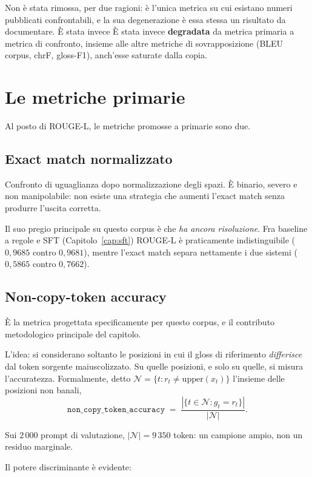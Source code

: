 Non è stata rimossa, per due ragioni: è l'unica metrica su cui esistano numeri
pubblicati confrontabili, e la sua degenerazione è essa stessa un risultato da
documentare. È stata invece  È stata invece \textbf{degradata} da metrica primaria a metrica di
confronto, insieme alle altre metriche di sovrapposizione (BLEU corpus, chrF,
gloss-F1), anch'esse saturate dalla copia.\section{Le metriche primarie}

Al posto di ROUGE-L, le metriche promosse a primarie sono due.

\subsection{Exact match normalizzato}

Confronto di uguaglianza dopo normalizzazione degli spazi. È binario, severo e
non manipolabile: non esiste una strategia che aumenti l'exact match senza
produrre l'uscita corretta.

Il suo pregio principale su questo corpus è che \emph{ha ancora risoluzione}.
Fra baseline a regole e SFT (Capitolo~\ref{cap:sft}) ROUGE-L è praticamente
indistinguibile ($0{,}9685$ contro $0{,}9681$), mentre l'exact match separa
nettamente i due sistemi ($0{,}5865$ contro $0{,}7662$).\subsection{Non-copy-token accuracy}

È la metrica progettata specificamente per questo corpus, e il contributo
metodologico principale del capitolo.

L'idea: si considerano soltanto le posizioni in cui il gloss di riferimento
\emph{differisce} dal token sorgente maiuscolizzato. Su quelle posizioni, e solo
su quelle, si misura l'accuratezza. Formalmente, detto
$\mathcal{N} = \{ t : r_t \neq \mathrm{upper}(x_t) \}$ l'insieme delle posizioni
non banali,
\begin{equation}
  \label{eq:noncopy}
  \texttt{non\_copy\_token\_accuracy}
  \;=\;
  \frac{|\{ t \in \mathcal{N} : g_t = r_t \}|}{|\mathcal{N}|}.
\end{equation}

Sui $2\,000$ prompt di valutazione, $|\mathcal{N}| = 9\,350$ token: un campione
ampio, non un residuo marginale.

Il potere discriminante è evidente:

